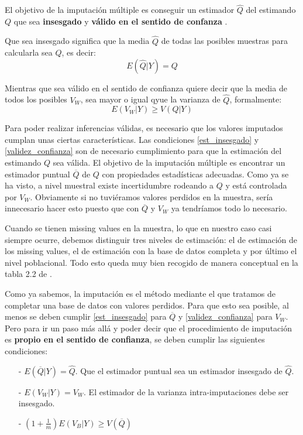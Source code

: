 \documentclass[a4paper,openright,12pt]{report}
\begin{document}
El objetivo de la imputación múltiple es conseguir un estimador $\widehat{Q}$ del estimando $Q$ que sea \textbf{insesgado} y \textbf{válido en el sentido de confanza} \cite{Rubin1996}. 

Que sea insesgado significa que la media $\widehat{Q}$ de todas las posibles muestras para calcularla sea $Q$, es decir:
\begin{equation}
E(\widehat{Q}\vert Y)= Q
\label{est_insesgado}
\end{equation} 

Mientras que sea válido en el sentido de confianza quiere decir que la media de todos los posibles $V_{W}$, sea mayor o igual qyue la varianza de $\widehat{Q}$, formalmente:
\begin{equation}
E(V_{W}\vert Y)\geq V(Q\vert Y)
\label{validez_confianza}
\end{equation}

Para poder realizar inferencias válidas, es necesario que los valores imputados cumplan unas ciertas características. Las condiciones \ref{est_insesgado} y \ref{validez_confianza} son de necesario cumplimiento para que la estimación del estimando $Q$ sea válida. El objetivo de la imputación múltiple es encontrar un estimador puntual $\overline{Q}$ de $Q$ con propiedades estadísticas adecuadas. Como ya se ha visto, a nivel muestral existe incertidumbre rodeando a $Q$ y está controlada por $V_{W}$. Obviamente si no tuviéramos valores perdidos en la muestra, sería innecesario hacer esto puesto que con $\overline{Q}$ y $V_{W}$ ya tendríamos todo lo necesario.

Cuando se tienen missing values en la muestra, lo que en nuestro caso casi siempre ocurre, debemos distinguir tres niveles de estimación: el de estimación de los missing values, el de estimación con la base de datos completa y por último el nivel poblacional. Todo esto queda muy bien recogido de manera conceptual en la tabla 2.2 de \cite{VanBuuren2012}.

Como ya sabemos, la imputación es el método mediante el que tratamos de completar una base de datos con valores perdidos. Para que esto sea posible, al menos se deben cumplir \ref{est_insesgado} para $\overline{Q}$ y \ref{validez_confianza} para $V_{W}$. Pero para ir un paso más allá y poder decir que el procedimiento de imputación es \textbf{propio en el sentido de confianza}, se deben cumplir las siguientes condiciones:

\begin{itemize}
\item[-] $E(\overline{Q}\vert Y)=\widehat{Q}$. Que el estimador puntual sea un estimador insesgado de $\widehat{Q}$.
\item[-] $E(V_{W}\vert Y)=V_{W}$. El estimador de la varianza intra-imputaciones debe ser insesgado.
\item[-] $(1+\frac{1}{m})E(V_{B}\vert Y)\geq V(\overline{Q})$
\end{itemize}
\end{document}
